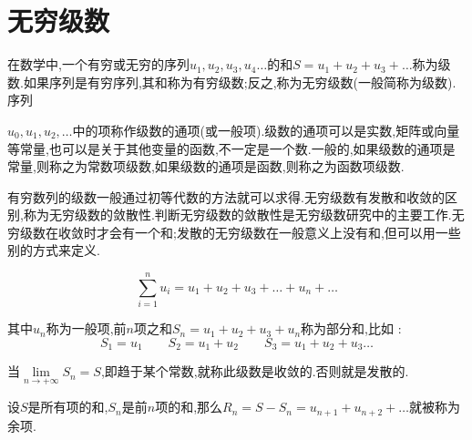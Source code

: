 \documentclass[UTF8,12pt]{ctexbook}
\newcommand{\limNormal}[1]{\lim\limits_{#1}}
\newcommand{\upDownSum}[2]{\sum\limits_{#2}^{#1}}
\begin{document}
{{{  }%

}%

\section{无穷级数}{
在数学中,一个有穷或无穷的序列$u_{1},u_{2},u_{3},u_{4}\ldots$的和$S=u_{1}+u_{2}+u_{3}+\ldots$称为级数.如果序列是有穷序列,其和称为有穷级数;反之,称为无穷级数(一般简称为级数).序列{$u_{0},u_{1},u_{2},\ldots$中的项称作级数的通项(或一般项).级数的通项可以是实数,矩阵或向量等常量,也可以是关于其他变量的函数,不一定是一个数.一般的,如果级数的通项是常量,则称之为常数项级数,如果级数的通项是函数,则称之为函数项级数.

有穷数列的级数一般通过初等代数的方法就可以求得.无穷级数有发散和收敛的区别,称为无穷级数的敛散性.判断无穷级数的敛散性是无穷级数研究中的主要工作.无穷级数在收敛时才会有一个和;发散的无穷级数在一般意义上没有和,但可以用一些别的方式来定义.

$$
  \upDownSum{n}{i = 1}u_i = u_1 + u_2 + u_3 + \dots + u_n +  \dots
$$

其中$u_n$称为一般项,前$n$项之和$S_n = u_1 + u_2 + u_3 + u_n$称为部分和,比如 :
$$
  S_1 = u_1\qquad S_2 = u_1 + u_2\qquad S_3 = u_1 + u_2 + u_3 \dots
$$

当$\limNormal{n \to +\infty}S_n = S$,即趋于某个常数,就称此级数是收敛的.否则就是发散的.

设$S$是所有项的和,$S_n$是前$n$项的和,那么$R_n = S - S_n = u_{n+1} + u_{n + 2} + \dots$就被称为余项.

}}}
\end{document}
